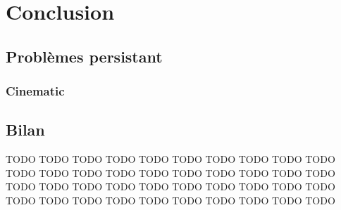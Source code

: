 \chapter{Conclusion}\label{chap:COnc}

\section{Problèmes persistant}

\subsection{Cinematic}

\section{Bilan}
 TODO TODO TODO TODO TODO TODO TODO TODO TODO TODO TODO TODO TODO TODO TODO TODO TODO TODO
 TODO TODO TODO TODO TODO TODO TODO TODO TODO TODO TODO TODO TODO TODO TODO TODO TODO TODO TODO TODO TODO TODO



